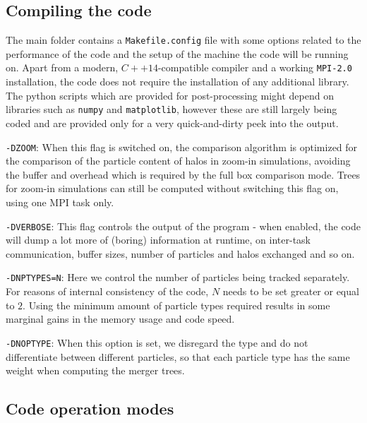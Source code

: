 \documentclass{article}
\begin{document}
\subsection{Compiling the code}

The main folder contains a \texttt{Makefile.config} file with some options related to the performance of the code and the 
setup of the machine the code will be running on. Apart from a modern, $C++14$-compatible compiler and a working 
\texttt{MPI-2.0} installation, the code does not require the installation of any additional library.
The python scripts which are provided for post-processing might depend on libraries such as \texttt{numpy} and \texttt{matplotlib},
however these are still largely being coded and are provided only for a very quick-and-dirty peek into the output.

\noindent
\texttt{-DZOOM}: When this flag is switched on, the comparison algorithm is optimized for the comparison of the 
particle content of halos in zoom-in simulations, avoiding the buffer and overhead which is required by the 
full box comparison mode. 
Trees for zoom-in simulations can still be computed without switching this flag on, using one MPI task only.

\noindent
\texttt{-DVERBOSE}: This flag controls the output of the program - when enabled, the code will dump a lot more of 
(boring) information at runtime, on inter-task communication, buffer sizes, number of particles and halos exchanged and so on.

\noindent
\texttt{-DNPTYPES=N}: Here we control the number of particles being tracked separately. For reasons of internal consistency 
of the code, $N$ needs to be set greater or equal to $2$. Using the minimum amount of particle types required results in some marginal
gains in the memory usage and code speed.

\noindent
\texttt{-DNOPTYPE}: When this option is set, we disregard the type and do not differentiate between different particles, so that
each particle type has the same weight when computing the merger trees.


\subsection{Code operation modes}
\end{document}
